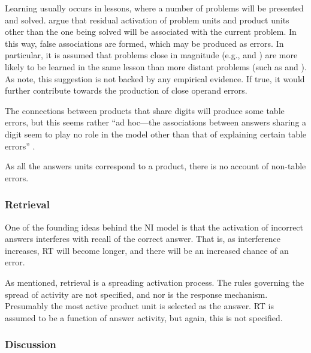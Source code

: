 Learning usually occurs in
lessons, where a number of problems will be presented and solved.
\citeauthor{camp85} argue that residual activation of problem units and
product units other than the one being solved will be associated with
the current problem. In this way, false associations are formed, which
may be produced as errors.  In particular, it is assumed that
problems close in magnitude (e.g.,  and ) are more likely to be
learned in the same lesson than more distant problems (such as  and
).  As  note, this suggestion is not
backed by any empirical evidence.  If true, it would further contribute
towards the production of close operand errors.

The connections between products
that share digits will produce some table errors, but this seems rather
``ad hoc---the associations between answers sharing a digit seem to
play no role in the model other than that of explaining certain table
errors'' \cite[p.~393]{mcclmode}.

As all the answers units correspond to a product, there is no account of
non-table errors.

\subsubsection{Retrieval}

One of the founding ideas behind the NI model is that the activation of
incorrect answers interferes with recall of the correct answer.  That
is, as interference increases, RT will become longer, and there will be
an increased chance of an error.

As mentioned, retrieval is a spreading activation process.  The
rules governing the spread of activity are not specified, and nor
is the response mechanism.  Presumably the most active product unit is
selected as the answer.  RT is assumed to be a function of
answer activity, but again, this is not specified.

\subsubsection{Discussion}

